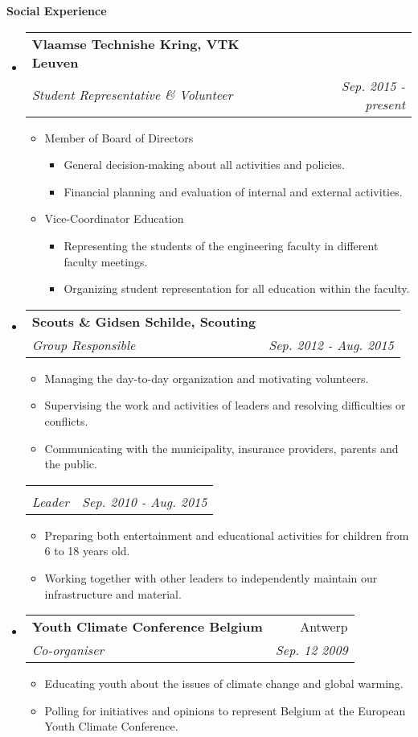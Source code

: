 \documentclass[letterpaper,11pt]{article}
\makeatletter
\newcommand{\resheading}[1]{{\large \colorbox{mygrey}{\begin{minipage}{\textwidth}{\textbf{#1 \vphantom{p\^{E}}}}\end{minipage}}}}
\newcommand{\ressubheading}[4]{
\begin{tabular*}{7.3in}{l@{\extracolsep{\fill}}r}
		\textbf{#1} & #2 \\
		\textit{#3} & \textit{#4} \\
\end{tabular*}\vspace{-6pt}}
\newcommand{\resitem}[1]{\item #1 \vspace{-2pt}}
\newcommand{\noresrepeat}[0]{\vspace{-20pt}}
\makeatother
\begin{document}
\resheading{Social Experience}
\begin{itemize}[leftmargin=*]

\item[]
	\ressubheading{Vlaamse Technishe Kring, VTK Leuven}{ }{Student Representative \& Volunteer}{Sep. 2015 - present}
	\begin{itemize}
		\resitem{Member of Board of Directors}
		\begin{itemize}
			\resitem{General decision-making about all activities and policies.}
			\resitem{Financial planning and evaluation of internal and external activities.}
		\end{itemize}
		\resitem{Vice-Coordinator Education}
		\begin{itemize}
			\resitem{Representing the students of the engineering faculty in different faculty meetings.}
			\resitem{Organizing student representation for all education within the faculty.}
		\end{itemize}
	\end{itemize}

\item[]
	\ressubheading{Scouts \& Gidsen Schilde, Scouting}{ }{Group Responsible}{Sep. 2012 - Aug. 2015}
	\begin{itemize}
			\resitem{Managing the day-to-day organization and motivating volunteers.}
			\resitem{Supervising the work and activities of leaders and resolving difficulties or conflicts.}
			\resitem{Communicating with the municipality, insurance providers, parents and the public.}
	\end{itemize}

	\ressubheading{\noresrepeat}{ }{Leader}{Sep. 2010 - Aug. 2015}
	\begin{itemize}
		\resitem{Preparing both entertainment and educational activities for children from 6 to 18 years old.}
		\resitem{Working together with other leaders to independently maintain our infrastructure and material.}
	\end{itemize}

\item[]
	\ressubheading{Youth Climate Conference Belgium}{Antwerp}{Co-organiser}{Sep. 12 2009}
	\begin{itemize}
		\resitem{Educating youth about the issues of climate change and global warming.}
		\resitem{Polling for initiatives and opinions to represent Belgium at the European Youth Climate Conference.}
	\end{itemize}


\end{itemize}
\end{document}
